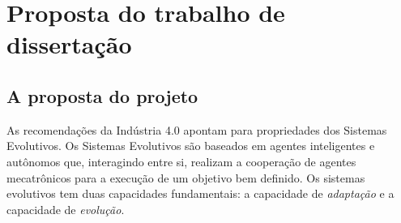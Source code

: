 \section{Proposta do trabalho de dissertação}



\subsection{A proposta do projeto}
\label{subsec:a_proposta_projeto}

As recomendações da Indústria 4.0 \cite{VDE2014} apontam para propriedades dos Sistemas Evolutivos. Os Sistemas Evolutivos são baseados em agentes inteligentes e autônomos que, interagindo entre si, realizam a cooperação de agentes mecatrônicos para a execução de um objetivo bem definido. Os sistemas evolutivos tem duas capacidades fundamentais: a capacidade de \textit{adaptação} e a capacidade de \textit{evolução}.{\tiny }

%
%
%
%	
%	
%
%	

